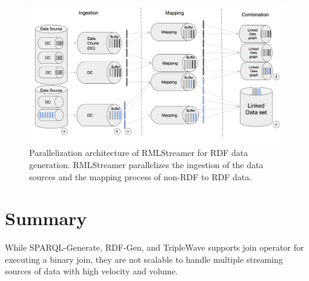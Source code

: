 \begin{figure}[!htbp]
  \centering
  \includegraphics[width=\textwidth]{fig/rml_streamer_arch.png}
  \caption{Parallelization architecture of RMLStreamer for RDF data generation. RMLStreamer parallelizes 
  the ingestion of the data sources and the mapping process of non-RDF to RDF data. }
  \label{fig:rml-parallel-arch}
\end{figure}


\section{Summary}
While SPARQL-Generate\cite{sparql_generate}, RDF-Gen\cite{rdf_gen}, and TripleWave\cite{triple_wave} 
supports join operator for executing a binary join, they are not scalable to handle multiple streaming 
sources of data with high velocity and volume. 






